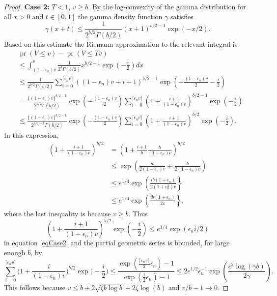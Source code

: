 \documentclass[10pt,a4paper]{amsart}
\newcommand{\pr}{\mathop{\mathrm{pr}}}
\begin{document}
\begin{proof}
	\noindent \textbf{Case 2:} $T < 1$, $v \geq b$. By the log-convexity of the gamma distribution for all $x > 0$ and $t \in [0,1]$ the gamma density function $\gamma$ satisfies 
	\[ \gamma(x + t) \leq  \frac{1}{2^{b/2} \Gamma(b/2)} (x +1)^{b/2 - 1} \exp(-x/2).
	\]
	Based on this estimate the Riemann approximation to the relevant integral is
	\begin{align}\label{eqCase2}
		\nonumber     &\pr\left( V \leq v \right) - \pr(V \leq Tv) 
		\\
		\nonumber        &\leq \int^{v}_{(1 -\epsilon_n)v} \frac{1}{2^b\Gamma(b/2)} x^{b/2-1} \exp\left( -\frac{x}{2} \right) dx\\
		\nonumber        &\leq \frac{1}{2^{b/2}\Gamma(b/2)} \sum^{ \lceil \epsilon_n v \rceil}_{  i = 0}  ((1 -\epsilon_n)v+i+1)^{b/2-1} \exp\left( -\frac{ (1 -\epsilon_n)v }{2} - \frac{i}{2} \right)\\
		\nonumber        &= \frac{\{(1 -\epsilon_n)v\}^{b/2-1}}{2^{b/2}\Gamma(b/2)} \exp\left( -\frac{ (1 -\epsilon_n)v }{2} \right) \sum^{ \lceil \epsilon_n v \rceil}_{  i = 0}  \left(1+ \frac{i + 1}{(1 -\epsilon_n)v} \right)^{b/2-1} \exp\left(- \frac{i}{2} \right) \\
		&\leq \frac{\{(1 -\epsilon_n)v\}^{b/2-1}}{2^{b/2 -1}\Gamma(b/2)} \exp\left( -\frac{ (1 -\epsilon_n)v }{2} \right) \sum^{ \lceil \epsilon_n v \rceil}_{  i = 0}  \left(1+ \frac{i + 1}{(1 -\epsilon_n)v} \right)^{b/2} \exp\left(- \frac{i}{2} \right).
	\end{align}
	In this expression,
	\begin{align*}
		\left(1+ \frac{i + 1}{(1 -\epsilon_n)v} \right)^{b/2} &= \left(1+ \frac{i + 1}{b} \frac{b}{(1 -\epsilon_n)v} \right)^{b/2} \\
		&\leq \exp\left(\frac{ib}{2(1 -\epsilon_n)v } + \frac{b}{2(1 - \epsilon_n)v}\right) \\
		&\leq e^{1/4}  \exp\left(\frac{ib(1 +\epsilon_n)}{2(1 +\epsilon_n^2)v } \right\}\\
		&\leq e^{1/4}  \exp\left(\frac{ib(1 +\epsilon_n)}{2v } \right\},
	\end{align*}
	where the last inequality is because $v \geq b$. Thus 
	\[
	\left(1+ \frac{i + 1}{(1 -\epsilon_n)v} \right)^{b/2} \exp\left(- \frac{i}{2} \right) \leq e^{1/4}\exp(\epsilon_n i/2 )
	\]
	in equation \eqref{eqCase2} and the partial geometric series is bounded,  for large enough $b$, by
	\[
	\sum^{ \lceil \epsilon_n v \rceil}_{  i = 0}  \biggl(1+ \frac{i}{(1 -\epsilon_n)v} \biggr)^{b/2} \exp\biggl(- \frac{i}{2} \biggr) \leq \frac{  \exp( \frac{\lceil \epsilon_n v \rceil}{2} \epsilon_n ) - 1}{ \exp(\frac{1}{2} \epsilon_n )  -1} \leq 2e^{1/2}\epsilon_n^{-1}\exp\left( \frac{c^2\log(\gamma b)}{2\gamma} \right).
	\]
	This follows because $v \leq b + 2\sqrt{\zeta b\log b} + 2\zeta\log(b)$ and $v/b - 1 \rightarrow 0$. 
	

\end{proof}
\end{document}
